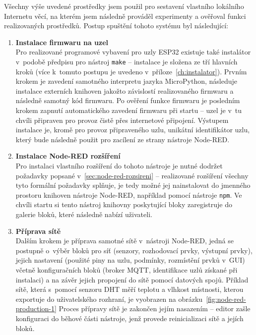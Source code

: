 Všechny výše uvedené prostředky jsem použil pro sestavení vlastního lokálního Internetu věcí, na kterém jsem následně
prováděl experimenty a ověřoval funkci realizovaných prostředků.
Postup spuštění tohoto systému byl následující:
\begin{enumerate}
    \item \textbf{Instalace firmwaru na uzel} \\
    Pro realizované programové vybavení pro uzly ESP32 existuje také instalátor v~podobě předpisu pro nástroj
    \texttt{make} -- instalace je složena ze tří hlavních kroků (více k~tomuto postupu je uvedeno
    v~příloze~\ref{ch:instalator}).
    Prvním krokem je zavedení samotného interpretu jazyka MicroPython, následuje instalace externích knihoven jakožto
    závislostí realizovaného firmwaru a následně samotný kód firmwaru.
    Po ověření funkce firmwaru je posledním krokem zapnutí automatického zavedení firmwaru při startu -- uzel je v~tu
    chvíli připraven pro provoz čistě přes internetové připojení.
    Výstupem instalace je, kromě pro provoz připraveného uzlu, unikátní identifikátor uzlu, který bude následně použit
    pro zacílení ze strany nástroje Node-RED.

    \item \textbf{Instalace Node-RED rozšíření} \\
    Pro instalaci vlastního rozšíření do tohoto nástroje je nutné dodržet požadavky popsané
    v~\ref{sec:node-red-rozsireni} -- realizované rozšíření všechny tyto formální požadavky splňuje, je tedy možné jej
    nainstalovat do jmenného prostoru knihoven nástroje Node-RED, například pomocí nástroje \texttt{npm}.
    Ve chvíli startu si tento nástroj knihovny poskytující bloky zaregistruje do galerie bloků, které následně nabízí
    uživateli.

    \item \textbf{Příprava sítě} \\
    Dalším krokem je příprava samotné sítě v~nástroji Node-RED, jedná se postupně o~výběr bloků pro síť (senzory,
    rozhodovací prvky, výstupní prvky), jejich nastavení (použité piny na uzlu, podmínky, rozmístění prvků v~GUI)
    včetně konfiguračních bloků (broker MQTT, identifikace uzlů získané při instalaci) a na závěr jejich propojení do
    sítě pomocí datových spojů.
    Příklad sítě, která s~pomocí senzoru DHT měří teplotu a vlhkost místnosti, kterou
    exportuje do uživatelského rozhraní, je vyobrazen na obrázku~\ref{fig:node-red-production-1}
    Proces přípravy sítě je zakončen jejím nasazením -- editor zašle konfiguraci do běhové části nástroje, jenž provede
    reinicializaci sítě a jejích bloků.
\end{enumerate}

